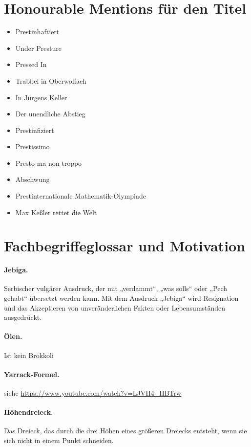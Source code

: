 \documentclass[oneside]{memoir}
\begin{document}
\section*{Honourable Mentions für den Titel}
\begin{itemize}
\item Prestinhaftiert
\item Under Presture
\item Pressed In
\item Trabbel in Oberwolfach
\item In Jürgens Keller
\item Der unendliche Abstieg
\item Prestinfiziert
\item Prestissimo
\item Presto ma non troppo
\item Abschwung
\item Prestinternationale Mathematik-Olympiade
\item Max Keßler rettet die Welt
\end{itemize}

\section*{Fachbegriffeglossar und Motivation}

\paragraph{Jebiga.} Serbischer vulgärer Ausdruck, der mit „verdammt“, „was solls“ oder „Pech gehabt“ übersetzt werden kann. Mit dem Ausdruck „Jebiga“ wird Resignation und das Akzeptieren von unveränderlichen Fakten oder Lebensumständen ausgedrückt.

\paragraph{Ölen.} Ist kein Brokkoli

\paragraph{Yarrack-Formel.} siehe \url{https://www.youtube.com/watch?v=LJVH4_HBTrw}

\paragraph{Höhendreieck.}  Das Dreieck, das durch die drei Höhen eines größeren Dreiecks entsteht, wenn sie sich nicht in einem Punkt schneiden.
\end{document}
